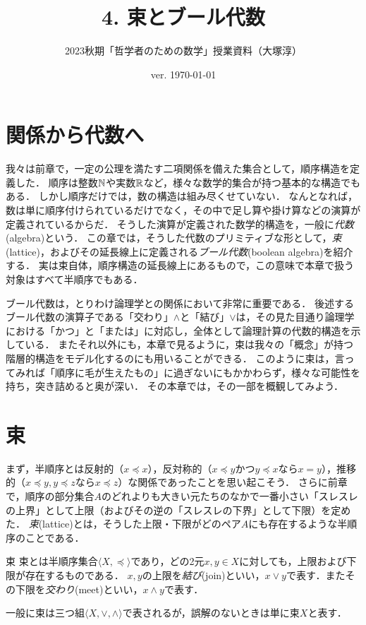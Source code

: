 \documentclass[11pt,a4paper]{jsarticle}
\begin{document}
\title{4. 束とブール代数}
\author{2023秋期「哲学者のための数学」授業資料（大塚淳）}
\date{ver. \today}
\maketitle

\section{関係から代数へ}
我々は前章で，一定の公理を満たす二項関係を備えた集合として，順序構造を定義した．
順序は整数$\mathbb{N}$や実数$\mathbb{R}$など，様々な数学的集合が持つ基本的な構造でもある．
しかし順序だけでは，数の構造は組み尽くせていない．
なんとなれば，数は単に順序付けられているだけでなく，その中で足し算や掛け算などの演算が定義されているからだ．
そうした演算が定義された数学的構造を，一般に\emph{代数}(algebra)という．
この章では，そうした代数のプリミティブな形として，\emph{束}(lattice)，およびその延長線上に定義される\emph{ブール代数}(boolean algebra)を紹介する．
実は束自体，順序構造の延長線上にあるもので，この意味で本章で扱う対象はすべて半順序でもある．

ブール代数は，とりわけ論理学との関係において非常に重要である．
後述するブール代数の演算子である「交わり」$\wedge$と「結び」$\vee$は，その見た目通り論理学における「かつ」と「または」に対応し，全体として論理計算の代数的構造を示している．
またそれ以外にも，本章で見るように，束は我々の「概念」が持つ階層的構造をモデル化するのにも用いることができる．
このように束は，言ってみれば「順序に毛が生えたもの」に過ぎないにもかかわらず，様々な可能性を持ち，突き詰めると奥が深い．
その本章では，その一部を概観してみよう．

\section{束}

まず，半順序とは反射的（$x \preceq x$），反対称的（$x \preceq y$かつ$y \preceq x$なら$x=y$），推移的（$x \preceq y, y \preceq z$なら$x \preceq z$）な関係であったことを思い起こそう．
さらに前章で，順序の部分集合$A$のどれよりも大きい元たちのなかで一番小さい「スレスレの上界」として上限（およびその逆の「スレスレの下界」として下限）を定めた．
\emph{束}(lattice)とは，そうした上限・下限がどのペア$A$にも存在するような半順序のことである．

\begin{itembox}[l]{束}
束とは半順序集合$\langle X, \preceq \rangle$であり，どの2元$x, y \in X$に対しても，上限および下限が存在するものである．
$x, y$の上限を\emph{結び}(join)といい，$x \vee y$で表す．またその下限を\emph{交わり}(meet)といい，$x \wedge y$で表す．

一般に束は三つ組$\langle X, \vee, \wedge \rangle$で表されるが，誤解のないときは単に束$X$と表す．
\end{itembox}
\end{document}
